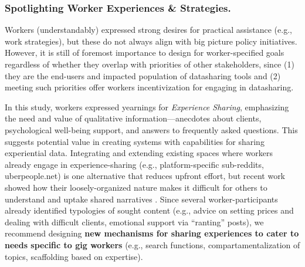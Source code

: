 \subsubsection{{\textbf{Spotlighting Worker Experiences \& Strategies.}}}
{Workers (understandably) expressed strong desires for practical assistance (e.g., work strategies), but these do not always align with big picture policy initiatives. 
However, it is still of foremost importance to design for worker-specified goals regardless of whether they overlap with priorities of other stakeholders, since (1) they are the end-users and impacted population of datasharing tools and (2) meeting such priorities offer workers incentivization for engaging in datasharing. 

In this study, workers expressed yearnings for \textit{Experience Sharing}, emphasizing the need and value of qualitative information---anecdotes about clients, psychological well-being support, and answers to frequently asked questions. %
%
This suggests potential value in creating systems with capabilities for sharing experiential data. Integrating and extending existing spaces where workers already engage in experience-sharing (e.g., platform-specific sub-reddits, uberpeople.net) \cite{atom, woodcock2019gig} is one alternative that reduces upfront effort, but recent work showed how their loosely-organized nature makes it difficult for others to understand and uptake shared narratives \cite{peersupport}. 
Since several worker-participants already identified typologies of sought content (e.g., advice on setting prices and dealing with difficult clients, emotional support via ``ranting'' posts), we recommend designing \textbf{new mechanisms for sharing experiences to cater to needs specific to gig workers} (e.g., search functions, compartamentalization of topics, scaffolding based on expertise).}

